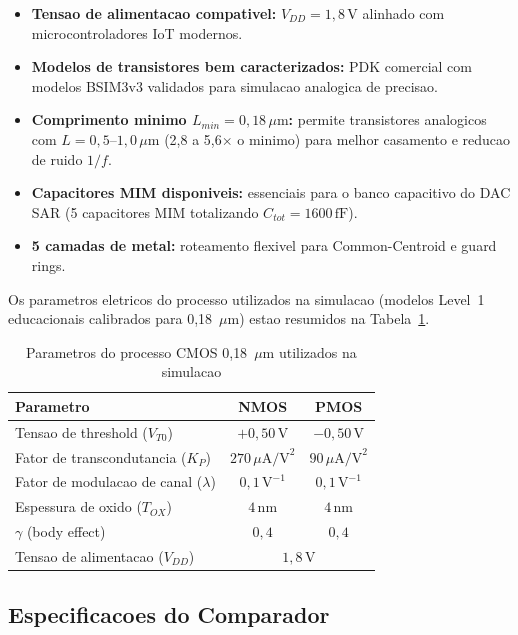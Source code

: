 \documentclass[12pt, a4paper]{article}
\begin{document}
\begin{itemize}[noitemsep]
  \item \textbf{Tensao de alimentacao compativel:} $V_{DD} = 1{,}8\,\text{V}$
        alinhado com microcontroladores IoT modernos.
  \item \textbf{Modelos de transistores bem caracterizados:} PDK comercial com
        modelos BSIM3v3 validados para simulacao analogica de precisao.
  \item \textbf{Comprimento minimo $L_{min} = 0{,}18\,\mu\text{m}$:} permite
        transistores analogicos com $L = 0{,}5$--$1{,}0\,\mu\text{m}$ (2,8 a 5,6$\times$
        o minimo) para melhor casamento e reducao de ruido $1/f$.
  \item \textbf{Capacitores MIM disponiveis:} essenciais para o banco capacitivo
        do DAC SAR (5 capacitores MIM totalizando $C_{tot}=1600\,\text{fF}$).
  \item \textbf{5 camadas de metal:} roteamento flexivel para Common-Centroid e
        guard rings.
\end{itemize}

Os parametros eletricos do processo utilizados na simulacao (modelos Level~1
educacionais calibrados para 0{,}18~$\mu$m) estao resumidos na
Tabela~\ref{tab:tech}.

\begin{table}[H]
\centering
\caption{Parametros do processo CMOS 0{,}18~$\mu$m utilizados na simulacao}
\label{tab:tech}
\begin{tabular}{lcc}
\toprule
\textbf{Parametro}          & \textbf{NMOS}  & \textbf{PMOS} \\
\midrule
Tensao de threshold ($V_{T0}$)         & $+0{,}50\,\text{V}$ & $-0{,}50\,\text{V}$ \\
Fator de transcondutancia ($K_P$)      & $270\,\mu\text{A/V}^2$ & $90\,\mu\text{A/V}^2$ \\
Fator de modulacao de canal ($\lambda$) & $0{,}1\,\text{V}^{-1}$ & $0{,}1\,\text{V}^{-1}$ \\
Espessura de oxido ($T_{OX}$)          & $4\,\text{nm}$    & $4\,\text{nm}$ \\
$\gamma$ (body effect)                 & $0{,}4$           & $0{,}4$ \\
Tensao de alimentacao ($V_{DD}$)        & \multicolumn{2}{c}{$1{,}8\,\text{V}$} \\
\bottomrule
\end{tabular}
\end{table}

\subsection{Especificacoes do Comparador}
\end{document}
